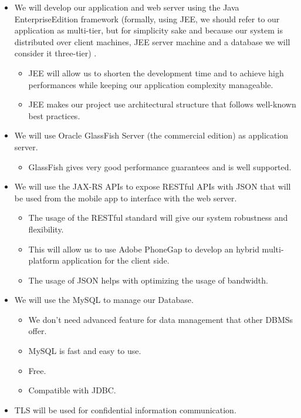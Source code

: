 \documentclass[]{article}
\providecommand{\tightlist}{%
  \setlength{\itemsep}{0pt}\setlength{\parskip}{0pt}}
\begin{document}
\begin{itemize}
\item
  We will develop our application and web server using the Java
  EnterpriseEdition framework (formally, using JEE, we should refer to
  our application as multi-tier, but for simplicity sake and because our
  system is distributed over client machines, JEE server machine and a
  database we will consider it three-tier) .

  \begin{itemize}
  \tightlist
  \item
    JEE will allow us to shorten the development time and to achieve
    high performances while keeping our application complexity
    manageable.
  \item
    JEE makes our project use architectural structure that follows
    well-known best practices.
  \end{itemize}
\item
  We will use Oracle GlassFish Server (the commercial edition) as
  application server.

  \begin{itemize}
  \tightlist
  \item
    GlassFish gives very good performance guarantees and is well
    supported.
  \end{itemize}
\item
  We will use the JAX-RS APIs to expose RESTful APIs with JSON that will
  be used from the mobile app to interface with the web server.

  \begin{itemize}
  \tightlist
  \item
    The usage of the RESTful standard will give our system robustness
    and flexibility.
  \item
    This will allow us to use Adobe PhoneGap to develop an hybrid
    multi-platform application for the client side.
  \item
    The usage of JSON helps with optimizing the usage of bandwidth.
  \end{itemize}
\item
  We will use the MySQL to manage our Database.

  \begin{itemize}
  \tightlist
  \item
    We don't need advanced feature for data management that other DBMSs
    offer.
  \item
    MySQL is fast and easy to use.
  \item
    Free.
  \item
    Compatible with JDBC.
  \end{itemize}
\item
  TLS will be used for confidential information communication. \newline
\end{itemize}
\end{document}
